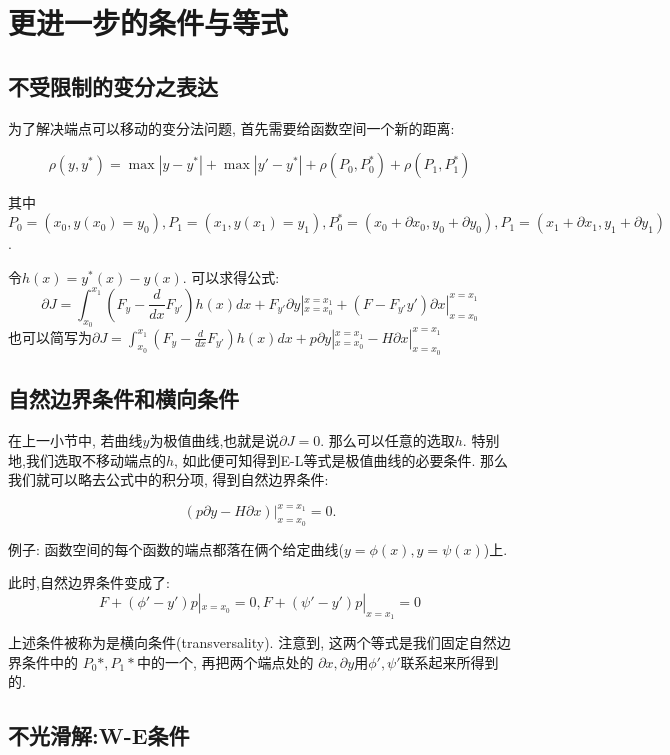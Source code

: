 \section{更进一步的条件与等式}

\subsection{不受限制的变分之表达}

为了解决端点可以移动的变分法问题, 首先需要给函数空间一个新的距离:

\[\rho(y,y^*) = \max|y - y^*| + \max|y' - y^*| + \rho (P_0,P_0^*) + \rho(P_1,P_1^*)\]

其中\( P_0 = (x_0,y(x_0) = y_0),  P_1 = (x_1, y(x_1) = y_1), P_0^* = (x_0 + \partial x_0, y_0 + \partial y_0), P_1 = (x_1 + \partial x_1, y_1 + \partial y_1)\).

令\(h(x) = y^*(x) - y(x)\). 可以求得公式:
\[\partial J = \int_{x_0}^{x_1} (F_y - \frac{d}{dx}F_{y'})h(x) dx + F_{y'}\partial y|^{x = x_1}_{x = x_0} + (F- F_{y'}y')\partial x|_{x = x_0}^{x = x_1} \]
也可以简写为\(\partial J = \int_{x_0}^{x_1} (F_y - \frac{d}{dx}F_{y'})h(x) dx + p\partial y|^{x = x_1}_{x = x_0} - H\partial x|_{x = x_0}^{x = x_1}\)


\subsection{自然边界条件和横向条件}

在上一小节中, 若曲线\(y\)为极值曲线,也就是说\(\partial J = 0\).
那么可以任意的选取\(h\). 特别地,我们选取不移动端点的\(h\),
如此便可知得到E-L等式是极值曲线的必要条件.
那么我们就可以略去公式中的积分项, 得到自然边界条件:

\[(p\partial y - H\partial x)|_{x = x_0}^{x = x_1} = 0.\]

例子: 函数空间的每个函数的端点都落在俩个给定曲线(\(y = \phi(x), y = \psi(x)\))上.

此时,自然边界条件变成了:
\[ F + (\phi' - y')p |_{x = x_0} = 0, F + (\psi' - y')p |_{x = x_1} = 0\]

上述条件被称为是横向条件(transversality).
注意到, 这两个等式是我们固定自然边界条件中的
\(P_0*,P_1*\)中的一个, 再把两个端点处的
\(\partial x, \partial y\)用\(\phi',\psi'\)联系起来所得到的.


\subsection{不光滑解:W-E条件}

